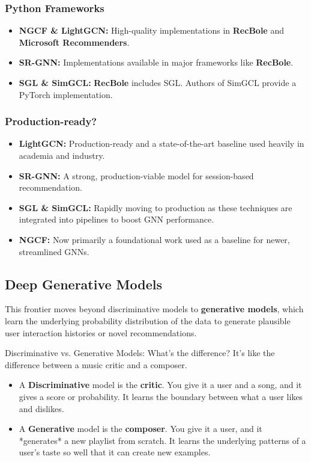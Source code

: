 \documentclass{article}
\begin{document}
    \subsubsection*{Python Frameworks}
    \begin{itemize}
        \item \textbf{NGCF \& LightGCN:} High-quality implementations in \textbf{RecBole} and \textbf{Microsoft Recommenders}.
        \item \textbf{SR-GNN:} Implementations available in major frameworks like \textbf{RecBole}.
        \item \textbf{SGL \& SimGCL:} \textbf{RecBole} includes SGL. Authors of SimGCL provide a PyTorch implementation.
    \end{itemize}
    
    \subsubsection*{Production-ready?}
    \begin{itemize}
        \item \textbf{LightGCN:} Production-ready and a state-of-the-art baseline used heavily in academia and industry.
        \item \textbf{SR-GNN:} A strong, production-viable model for session-based recommendation.
        \item \textbf{SGL \& SimGCL:} Rapidly moving to production as these techniques are integrated into pipelines to boost GNN performance.
        \item \textbf{NGCF:} Now primarily a foundational work used as a baseline for newer, streamlined GNNs.
    \end{itemize}
    
    \subsection{Deep Generative Models}
    This frontier moves beyond discriminative models to \textbf{generative models}, which learn the underlying probability distribution of the data to generate plausible user interaction histories or novel recommendations.
    
    \begin{asidebox}{Discriminative vs. Generative Models: What's the difference?}
    It's like the difference between a music critic and a composer.
    \begin{itemize}
        \item A \textbf{Discriminative} model is the \textbf{critic}. You give it a user and a song, and it gives a score or probability. It learns the boundary between what a user likes and dislikes.
        \item A \textbf{Generative} model is the \textbf{composer}. You give it a user, and it *generates* a new playlist from scratch. It learns the underlying patterns of a user's taste so well that it can create new examples.
    \end{itemize}
    \end{asidebox}
\end{document}
